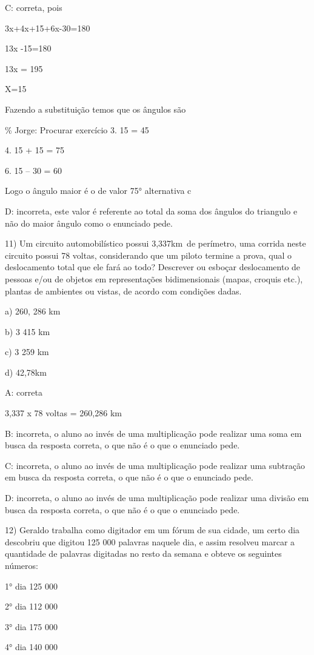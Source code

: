 C: correta, pois

3x+4x+15+6x-30=180

13x -15=180

13x = 195

X=15

Fazendo a substituição temos que os ângulos são

\% Jorge: Procurar exercício 3. 15 = 45

4. 15 + 15 = 75

6. 15 -- 30 = 60

Logo o ângulo maior é o de valor 75° alternativa c

D: incorreta, este valor é referente ao total da soma dos ângulos do
triangulo e não do maior ângulo como o enunciado pede.

11) Um circuito automobilístico possui 3,337km~de perímetro, uma corrida
neste circuito possui 78 voltas, considerando que um piloto termine a
prova, qual o deslocamento total que ele fará ao todo? Descrever ou
esboçar deslocamento de pessoas e/ou de objetos em representações
bidimensionais (mapas, croquis etc.), plantas de ambientes ou vistas, de
acordo com condições dadas.

a) 260, 286 km

b) 3 415 km

c) 3 259 km

d) 42,78km

A: correta

3,337 x 78 voltas = 260,286 km

B: incorreta, o aluno ao invés de uma multiplicação pode realizar uma
soma em busca da resposta correta, o que não é o que o enunciado pede.

C: incorreta, o aluno ao invés de uma multiplicação pode realizar uma
subtração em busca da resposta correta, o que não é o que o enunciado
pede.

D: incorreta, o aluno ao invés de uma multiplicação pode realizar uma
divisão em busca da resposta correta, o que não é o que o enunciado
pede.

12) Geraldo trabalha como digitador em um fórum de sua cidade, um certo
dia descobriu que digitou 125 000 palavras naquele dia, e assim resolveu
marcar a quantidade de palavras digitadas no resto da semana e obteve os
seguintes números:

1° dia 125 000

2° dia 112 000

3° dia 175 000

4° dia 140 000

